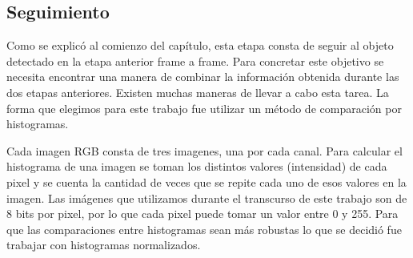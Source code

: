\subsection{Seguimiento}\label{tracking_rgb}
Como se explicó al comienzo del capítulo, esta etapa consta de seguir al objeto detectado en la etapa anterior frame a frame. Para concretar este objetivo se necesita encontrar una manera de combinar la información obtenida durante las dos etapas anteriores. Existen muchas maneras de llevar a cabo esta tarea. La forma que elegimos para este trabajo fue utilizar un método de comparación por histogramas.

Cada imagen RGB consta de tres imagenes, una por cada canal. Para calcular el histograma de una imagen se toman los distintos valores (intensidad) de cada pixel y se cuenta la cantidad de veces que se repite cada uno de esos valores en la imagen. Las imágenes que utilizamos durante el transcurso de este trabajo son de 8 bits por pixel, por lo que cada pixel puede tomar un valor entre 0 y 255. Para que las comparaciones entre histogramas sean más robustas lo que se decidió fue trabajar con histogramas normalizados.


